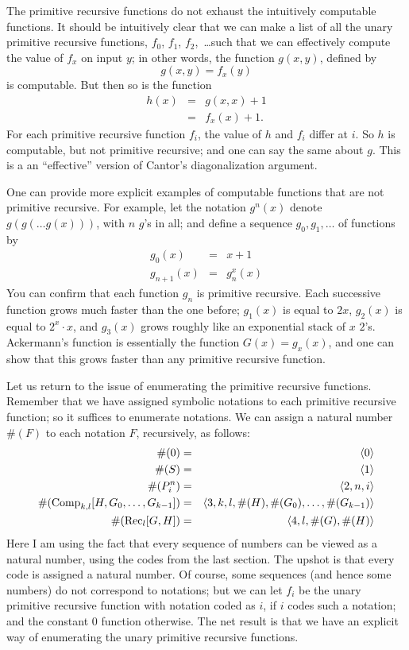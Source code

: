\documentclass[../../include/open-logic-section]{subfiles}
\begin{document}

The primitive recursive functions do not exhaust the intuitively
computable functions. It should be intuitively clear that we can make
a list of all the unary primitive recursive functions,
$f_0$, $f_1$, $f_2$,~\dots such that we can effectively compute the value of
$f_x$ on input $y$; in other words, the function $g(x,y)$, defined by
\[
g(x,y) = f_x(y)
\] 
is computable. But then so is the function 
\begin{eqnarray*}
h(x) & = & g(x,x) + 1 \\
& = & f_x(x) +1.
\end{eqnarray*}
For each primitive recursive function $f_i$, the value of $h$ and
$f_i$ differ at $i$. So $h$ is computable, but not primitive
recursive; and one can say the same about $g$.  This is a an
``effective'' version of Cantor's diagonalization argument.

One can provide more explicit examples of computable functions that
are not primitive recursive. For example, let the notation $g^n(x)$
denote $g(g(\dots g(x)))$, with $n$ $g$'s in all; and define a
sequence $g_0,g_1,\dots$ of functions by
\begin{eqnarray*}
g_0(x) & = & x+1 \\
g_{n + 1}(x) & = & g_n^x(x)
\end{eqnarray*}
You can confirm that each function $g_n$ is primitive recursive. Each
successive function grows much faster than the one before; $g_1(x)$ is
equal to $2x$, $g_2(x)$ is equal to $2^x \cdot x$, and $g_3(x)$ grows
roughly like an exponential stack of $x$ $2$'s. Ackermann's function is
essentially the function $G(x) = g_x(x)$, and one can show that this
grows faster than any primitive recursive function.

Let us return to the issue of enumerating the primitive recursive
functions. Remember that we have assigned symbolic notations to each
primitive recursive function; so it suffices to enumerate
notations. We can assign a natural number $\#(F)$ to each notation $F$,
recursively, as follows:
\begin{eqnarray*}
\#(0) & = & \langle 0 \rangle \\
\#(S) & = & \langle 1 \rangle \\
\#(\Proj{n}{i}) & = & \langle 2, n, i \rangle \\
\#(\fn{Comp}_{k,l}[H,G_0,\dots,G_{k-1}]) & = & \langle
3,k,l,\#(H),\#(G_0),\dots,\#(G_{k-1}) \rangle \\
\#(\fn{Rec}_l[G,H]) & = & \langle 4, l, \#(G), \#(H) \rangle
\end{eqnarray*}
Here I am using the fact that every sequence of numbers can be viewed
as a natural number, using the codes from the last section. The upshot
is that every code is assigned a natural number. Of course, some
sequences (and hence some numbers) do not correspond to notations; but
we can let $f_i$ be the unary primitive recursive function with
notation coded as $i$, if $i$ codes such a notation; and the constant
$0$ function otherwise. The net result is that we have an explicit way of
enumerating the unary primitive recursive functions.
\end{document}

